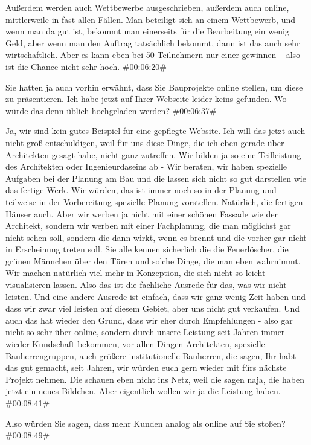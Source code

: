 \begin{description}
Außerdem werden auch Wettbewerbe ausgeschrieben, außerdem auch online, mittlerweile in fast allen Fällen. Man beteiligt sich an einem Wettbewerb, und wenn man da gut ist, bekommt man einerseits für die Bearbeitung ein wenig Geld, aber wenn man den Auftrag tatsächlich bekommt, dann ist das auch sehr wirtschaftlich. Aber es kann eben bei 50 Teilnehmern nur einer gewinnen – also ist die Chance nicht sehr hoch. \#00:06:20\#

\Fabian Sie hatten ja auch vorhin erwähnt, dass Sie Bauprojekte online stellen, um diese zu präsentieren. Ich habe jetzt auf Ihrer Webseite leider keins gefunden. Wo würde das denn üblich hochgeladen werden? \#00:06:37\#

\Andre Ja, wir sind kein gutes Beispiel für eine gepflegte Website. Ich will das jetzt auch nicht groß entschuldigen, weil für uns diese Dinge, die ich eben gerade über Architekten gesagt habe, nicht ganz zutreffen. Wir bilden ja so eine Teilleistung des Architekten oder Ingenieurdaseins ab - Wir beraten, wir haben spezielle Aufgaben bei der Planung am Bau und die lassen sich nicht so gut darstellen wie das fertige Werk. Wir würden, das ist immer noch so in der Planung und teilweise in der Vorbereitung spezielle Planung vorstellen. Natürlich, die fertigen Häuser auch. Aber wir werben ja nicht mit einer schönen Fassade wie der Architekt, sondern wir werben mit einer Fachplanung, die man möglichst gar nicht sehen soll, sondern die dann wirkt, wenn es brennt und die vorher gar nicht in Erscheinung treten soll. Sie alle kennen sicherlich die die Feuerlöscher, die grünen Männchen über den Türen und solche Dinge, die man eben wahrnimmt. Wir machen natürlich viel mehr in Konzeption, die sich nicht so leicht visualisieren lassen. Also das ist die fachliche Ausrede für das, was wir nicht leisten. Und eine andere Ausrede ist einfach, dass wir ganz wenig Zeit haben und dass wir zwar viel leisten auf diesem Gebiet, aber uns nicht gut verkaufen. Und auch das hat wieder den Grund, dass wir eher durch Empfehlungen - also gar nicht so sehr über online, sondern durch unsere Leistung seit Jahren immer wieder Kundschaft bekommen, vor allen Dingen Architekten, spezielle Bauherrengruppen, auch größere institutionelle Bauherren, die sagen, Ihr habt das gut gemacht, seit Jahren, wir würden euch gern wieder mit fürs nächste Projekt nehmen. Die schauen eben nicht ins Netz, weil die sagen naja, die haben jetzt ein neues Bildchen. Aber eigentlich wollen wir ja die Leistung haben. \#00:08:41\#

\Fabian Also würden Sie sagen, dass mehr Kunden analog als online auf Sie stoßen? \#00:08:49\#


\end{description}

